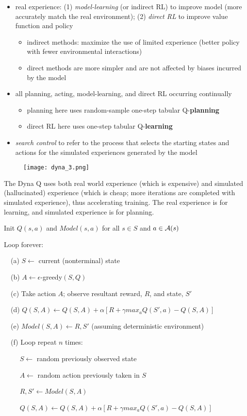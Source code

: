 \documentclass[sutton_barto_notes.tex]{subfiles}
\begin{document}
\begin{itemize}
\item real experience: (1) \textit{model-learning} (or indirect RL) to improve model (more accurately match the real environment); (2) \textit{direct RL} to improve value function and policy
\begin{itemize}
	\item indirect methods: maximize the use of limited experience (better policy with fewer environmental interactions)
	\item direct methods are more simpler and are not affected by biases incurred by the model
\end{itemize}
\item all planning, acting, model-learning, and direct RL occurring continually
\begin{itemize}
	\item planning here uses random-sample one-step tabular Q-\textbf{planning}
	\item direct RL here uses one-step tabular Q-\textbf{learning}
\end{itemize}
\item \textit{search control} to refer to the process that selects the starting states and actions for the simulated experiences generated by the model
\end{itemize}

\begin{figure}[!h]
  \centering
  \texttt{[image: dyna\_3.png]}
  \label{fig:dyna}
\end{figure}

The Dyna Q uses both real world experience (which is expensive) and simulated (hallucinated) experience (which is cheap; more iterations are completed with simulated experience), thus accelerating training. The real experience is for learning, and simulated experience is for planning.

\begin{tcolorbox}[width=1.1\textwidth,title={Tabular Dyna-Q}]
Init $Q(s,a)$ and $Model(s,a)$ for all $s \in S$ and $a \in \operatorname*{\mathcal{A}}(s)$

Loop forever:

$\quad$(a) $S \leftarrow$ current (nonterminal) state

$\quad$(b) $A \leftarrow \epsilon$-greedy$(S,Q)$

$\quad$(c) Take action $A$; observe resultant reward, $R$, and state, $S'$

$\quad$(d) $Q(S,A)\leftarrow Q(S,A)+\alpha [R + \gamma max_a Q(S',a) - Q(S,A)]$

$\quad$(e) $Model(S,A) \leftarrow R,S'$ (assuming deterministic environment)

$\quad$(f) Loop repeat $n$ times:

$\quad\quad$ $S \leftarrow$ random previously observed state

$\quad\quad$ $A \leftarrow$ random action previously taken in $S$

$\quad\quad$ $R, S' \leftarrow Model(S,A)$

$\quad\quad$ $Q(S,A)\leftarrow Q(S,A)+\alpha [R+\gamma max_a Q(S',a) - Q(S,A)]$
\end{tcolorbox}
\end{document}
